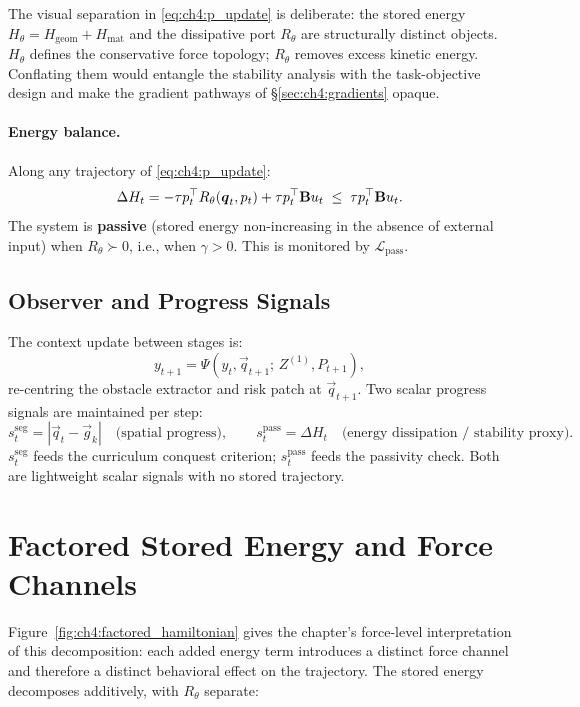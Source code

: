The visual separation in \eqref{eq:ch4:p_update} is deliberate:
the stored energy $H_\theta = H_{\mathrm{geom}} + H_{\mathrm{mat}}$
and the dissipative port $R_\theta$ are structurally distinct objects.
$H_\theta$ defines the conservative force topology;
$R_\theta$ removes excess kinetic energy.
Conflating them would entangle the stability analysis with the
task-objective design and make the gradient pathways of §\ref{sec:ch4:gradients}
opaque.

\paragraph{Energy balance.}
Along any trajectory of \eqref{eq:ch4:p_update}:
\begin{equation}
  \Delta H_t
  = -\tau p_t^\top R_\theta(\boldsymbol{q}_t,p_t)
    + \tau p_t^\top\mathbf{B}u_t
  \;\leq\; \tau p_t^\top\mathbf{B}u_t.
  \label{eq:ch4:energy_balance}
\end{equation}
The system is \textbf{passive} (stored energy non-increasing in the
absence of external input) when $R_\theta\succ 0$,
i.e., when $\gamma>0$.
This is monitored by $\mathcal{L}_{\mathrm{pass}}$.

\subsection{Observer and Progress Signals}
\label{subsec:ch4:observer}

The context update between stages is:
\begin{equation}
  y_{t+1} = \Psi(y_t, \vec{q}_{t+1};\, Z^{(1)}, P_{t+1}),
  \label{eq:ch4:observer}
\end{equation}
re-centring the obstacle extractor and risk patch at $\vec{q}_{t+1}$.
Two scalar progress signals are maintained per step:
\begin{equation}
  s_t^{\mathrm{seg}} = |\vec{q}_t - \vec{g}_k|
  \quad\text{(spatial progress)},
  \qquad
  s_t^{\mathrm{pass}} = \Delta H_t
  \quad\text{(energy dissipation / stability proxy)}.
  \label{eq:ch4:progress}
\end{equation}
$s_t^{\mathrm{seg}}$ feeds the curriculum conquest criterion;
$s_t^{\mathrm{pass}}$ feeds the passivity check.
Both are lightweight scalar signals with no stored trajectory.

\section{Factored Stored Energy and Force Channels}
\label{sec:ch4:energy}
Figure~\ref{fig:ch4:factored_hamiltonian} gives the chapter's
force-level interpretation of this decomposition: each added energy
term introduces a distinct force channel and therefore a distinct
behavioral effect on the trajectory.
The stored energy decomposes additively, with $R_\theta$ separate:

